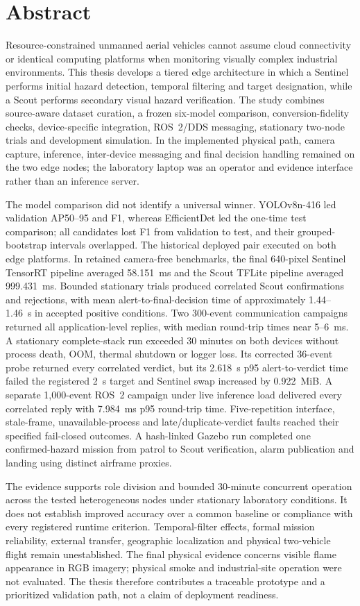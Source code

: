 \chapter*{Abstract}

Resource-constrained unmanned aerial vehicles cannot assume cloud connectivity
or identical computing platforms when monitoring visually complex industrial
environments. This thesis develops a tiered edge architecture in which a
Sentinel performs initial hazard detection, temporal filtering and target
designation, while a Scout performs secondary visual hazard verification. The
study combines source-aware dataset curation, a frozen six-model comparison,
conversion-fidelity checks, device-specific integration, ROS~2/DDS messaging,
stationary two-node trials and development simulation. In the implemented
physical path, camera capture, inference, inter-device messaging and final
decision handling remained on the two edge nodes; the laboratory laptop was an
operator and evidence interface rather than an inference server.

The model comparison did not identify a universal winner. YOLOv8n-416 led
validation AP50--95 and F1, whereas EfficientDet led the one-time test
comparison; all candidates lost F1 from validation to test, and their
grouped-bootstrap intervals overlapped. The historical deployed pair executed
on both edge platforms. In retained camera-free benchmarks, the final
640-pixel Sentinel TensorRT pipeline averaged 58.151~ms and the Scout TFLite
pipeline averaged 999.431~ms. Bounded stationary trials produced correlated
Scout confirmations and rejections, with mean alert-to-final-decision time of
approximately 1.44--1.46~s in accepted positive conditions. Two 300-event
communication campaigns returned all application-level replies, with median
round-trip times near 5--6~ms. A stationary complete-stack run exceeded 30
minutes on both devices without process death, OOM, thermal shutdown or logger
loss. Its corrected 36-event probe returned every correlated verdict, but its
2.618~s p95 alert-to-verdict time failed the registered 2~s target and Sentinel
swap increased by 0.922~MiB. A separate 1,000-event ROS~2 campaign under live
inference load delivered every correlated reply with 7.984~ms p95 round-trip
time. Five-repetition interface, stale-frame, unavailable-process and
late/duplicate-verdict faults reached their specified fail-closed outcomes. A
hash-linked Gazebo run completed one confirmed-hazard mission from patrol to
Scout verification, alarm publication and landing using distinct airframe
proxies.

The evidence supports role division and bounded 30-minute concurrent operation
across the tested heterogeneous nodes under stationary laboratory conditions.
It does not establish improved accuracy over a common baseline or compliance
with every registered runtime criterion. Temporal-filter effects, formal
mission reliability, external transfer,
geographic localization and physical two-vehicle flight remain unestablished.
The final physical evidence concerns visible flame appearance in RGB imagery;
physical smoke and industrial-site operation were not evaluated. The thesis
therefore contributes a traceable prototype and a prioritized validation path,
not a claim of deployment readiness.
